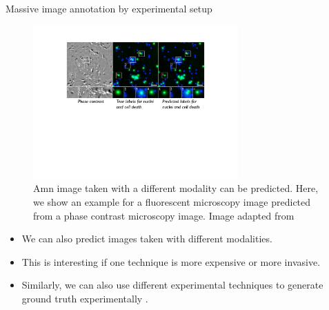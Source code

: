 \documentclass[xcolor=pdftex,dvipsnames,table]{beamer}
\begin{document}
\begin{frame}{Massive image annotation by experimental setup}
\begin{figure}[htb]
   \centering
   \includegraphics[width=0.7\textwidth]{../graphics/in_silico_labeling.pdf}
   \caption{Amn image taken with a different modality can be predicted. Here, we show an example for a fluorescent microscopy image predicted from a phase contrast microscopy image. Image adapted from \cite{Christiansen2018}}
\end{figure}
\begin{itemize}
   \item We can also predict images taken with different modalities. 
   \item This is interesting if one technique is more expensive or more invasive.
   \item Similarly, we can also use different experimental techniques to generate ground truth experimentally \cite{Boyd2020}. 
\end{itemize}
\end{frame}
\end{document}
